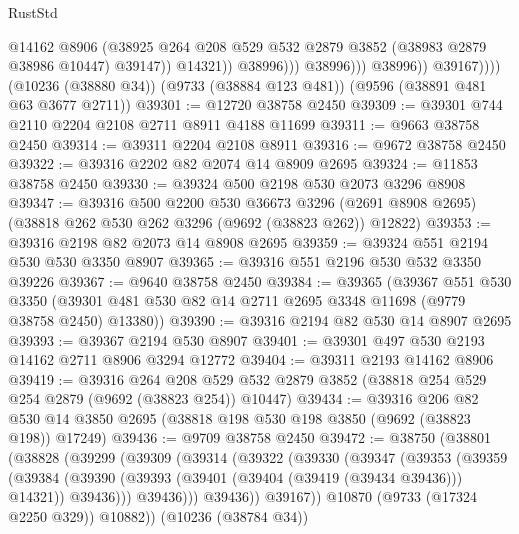 \begin{lexlean}{RustStd}
\begin{coremodule}
                                  @14162
                                  @8906
                                  (@38925
                                    @264
                                    @208
                                    @529
                                    @532
                                    @2879
                                    @3852
                                    (@38983 @2879 @38986 @10447)
                                    @39147))
                                @14321))
                            @38996)))
                      @38996)))
                @38996))
            @39167))))
    (@10236 (@38880 @34))
    (@9733 (@38884 @123 @481))
    (@9596 (@38891 @481 @63 @3677 @2711))
@39301 := @12720 @38758 @2450
@39309 := @39301 @744 @2110 @2204 @2108 @2711 @8911 @4188 @11699
@39311 := @9663 @38758 @2450
@39314 := @39311 @2204 @2108 @8911
@39316 := @9672 @38758 @2450
@39322 := @39316 @2202 @82 @2074 @14 @8909 @2695
@39324 := @11853 @38758 @2450
@39330 := @39324 @500 @2198 @530 @2073 @3296 @8908
@39347 := @39316
    @500
    @2200
    @530
    @36673
    @3296
    (@2691 @8908 @2695)
    (@38818 @262 @530 @262 @3296 (@9692 (@38823 @262)) @12822)
@39353 := @39316 @2198 @82 @2073 @14 @8908 @2695
@39359 := @39324 @551 @2194 @530 @530 @3350 @8907
@39365 := @39316 @551 @2196 @530 @532 @3350 @39226
@39367 := @9640 @38758 @2450
@39384 := @39365
    (@39367
      @551
      @530
      @3350
      (@39301 @481 @530 @82 @14 @2711 @2695 @3348 @11698 (@9779 @38758 @2450) @13380))
@39390 := @39316 @2194 @82 @530 @14 @8907 @2695
@39393 := @39367 @2194 @530 @8907
@39401 := @39301 @497 @530 @2193 @14162 @2711 @8906 @3294 @12772
@39404 := @39311 @2193 @14162 @8906
@39419 := @39316
    @264
    @208
    @529
    @532
    @2879
    @3852
    (@38818 @254 @529 @254 @2879 (@9692 (@38823 @254)) @10447)
@39434 := @39316
    @206
    @82
    @530
    @14
    @3850
    @2695
    (@38818 @198 @530 @198 @3850 (@9692 (@38823 @198)) @17249)
@39436 := @9709 @38758 @2450
@39472 := @38750
    (@38801
      (@38828
        (@39299
          (@39309
            (@39314
              (@39322
                (@39330
                  (@39347
                    (@39353
                      (@39359
                        (@39384
                          (@39390
                            (@39393 (@39401 (@39404 (@39419 (@39434 @39436))) @14321))
                            @39436)))
                      @39436)))
                @39436))
            @39167))
        @10870
        (@9733 (@17324 @2250 @329))
        @10882))
    (@10236 (@38784 @34))

\end{coremodule}
\end{lexlean}
